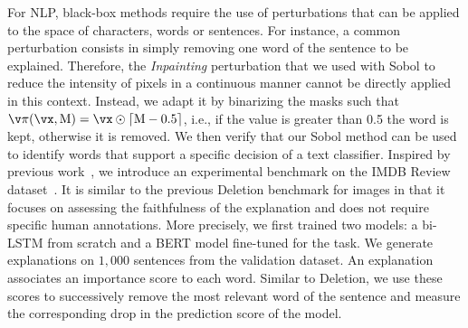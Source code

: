 \begin{table*}[t]
\centering
{}
\caption{\textbf{Word deletion} scores, obtained on 1,000 sentences. Delete up to 20 words per sentence accordingly to their relevance and track the impact on the classification performance. Lower is better.
The first and second best results are \textbf{bolded} and \underline{underlined}. \vspace{-0.2cm}
}\label{tab:word_deletion}
\vspace{-0.5cm}
\end{table*}

For NLP,  black-box methods require the use of perturbations that can be applied to the space of characters, words or sentences. For instance, a common perturbation consists in simply removing one word of the sentence to be explained. Therefore, the \textit{Inpainting} perturbation that we used with Sobol to reduce the intensity of pixels in a continuous manner cannot be directly applied in this context. Instead, we adapt it by binarizing the masks such that $\perturbation(\vx, \rm{M}) = \vx \odot \lceil\rm{M} - 0.5\rceil $, i.e., if the value is greater than 0.5 the word is kept, otherwise it is removed. We then verify that our Sobol method can be used to identify words that support a specific decision of a text classifier. Inspired by previous work~\cite{arras2017relevant, arras2017explaining, bach2015pixel}, we introduce an experimental benchmark on the IMDB Review dataset~\cite{imdb2011}. It is similar to the previous Deletion benchmark for images in that it focuses on assessing the faithfulness of the explanation and does not require specific human annotations.
More precisely, we first trained two models: a bi-LSTM from scratch and a BERT model fine-tuned for the task. We generate explanations on $1,000$ sentences from the validation dataset. An explanation associates an importance score to each word. Similar to Deletion, we use these scores to successively remove the most relevant word of the sentence and measure the corresponding drop in the prediction score of the model.

